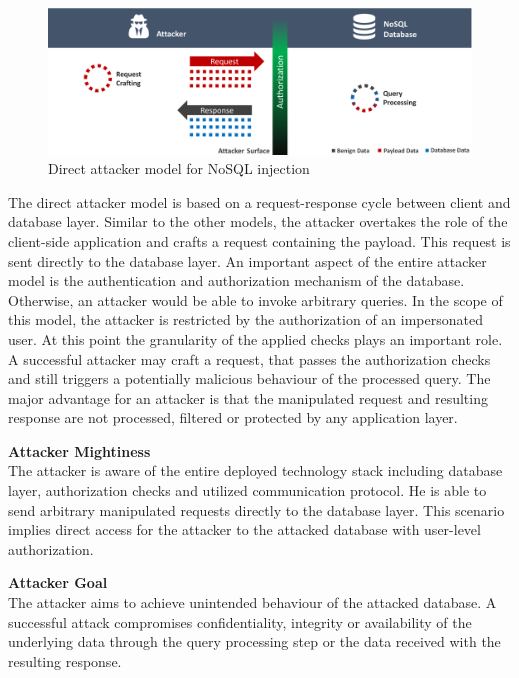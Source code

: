 \begin{figure}[h]
\centering
  \includegraphics[width=1\linewidth]{Images/attacker_model_direct}
  \caption{Direct attacker model for NoSQL injection}
  \label{fig:directAttackerModel}
\end{figure}

The direct attacker model is based on a request-response cycle between client and database layer. Similar to the other models, the attacker overtakes the role of the client-side application and crafts a request containing the payload. This request is sent directly to the database layer. An important aspect of the entire attacker model is the authentication and authorization mechanism of the database. Otherwise, an attacker would be able to invoke arbitrary queries. In the scope of this model, the attacker is restricted by the authorization of an impersonated user. At this point the granularity of the applied checks plays an important role. A successful attacker may craft a request, that passes the authorization checks and still triggers a potentially malicious behaviour of the processed query. The major advantage for an attacker is that the manipulated request and resulting response are not processed, filtered or protected by any application layer. \\

\begin{minipage}[t]{0.48\textwidth}
  \textbf{Attacker Mightiness} \\ 
  The attacker is aware of the entire deployed technology stack including database layer, authorization checks and utilized communication protocol. He is able to send arbitrary manipulated requests directly to the database layer. This scenario implies direct access for the attacker to the attacked database with user-level authorization.
\end{minipage}
\hfill
\begin{minipage}[t]{0.48\textwidth}
  \textbf{Attacker Goal} \\ 
  The attacker aims to achieve unintended behaviour of the attacked database. A successful attack compromises confidentiality, integrity or availability of the underlying data through the query processing step or the data received with the resulting response.
\end{minipage}


